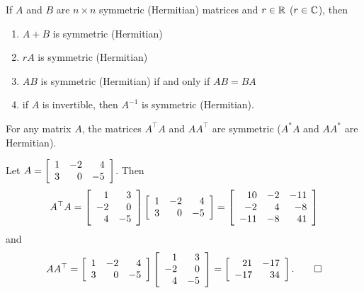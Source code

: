 \begin{Thm} If $A$ and $B$ are $n\times n$ symmetric (Hermitian) matrices and $r\in \R$ ($r\in \C$), then
\begin{multicols}{2}
\begin{enumerate}[!THM!, start =1]
\item $A+B$ is symmetric (Hermitian)\\
\item $rA$ is symmetric (Hermitian)\\
\item $AB$ is symmetric (Hermitian) if and only if $AB=BA$\\
\item if $A$ is invertible, then $A^{-1}$ is symmetric (Hermitian).
\end{enumerate}
\end{multicols}
\end{Thm}%
%

\begin{Thm} For any matrix $A$, the matrices $A^\top A$ and $AA^\top$ are symmetric ($A^*A$ and $AA^*$ are Hermitian).
\end{Thm}

\begin{Exam} Let $A= \mtx{rrr}{1&-2&4\\3&0&-5}$. Then 
\[A^\top A =  \mtx{rr}{1&3\\-2&0\\4&-5}\mtx{rrr}{1&-2&4\\3&0&-5}= \mtx{rrr}{10&-2&-11\\-2&4&-8\\-11&-8&41}\]
and
\[AA^\top = \mtx{rrr}{1&-2&4\\3&0&-5}\mtx{rr}{1&3\\-2&0\\4&-5} = \mtx{rr}{21&-17\\-17&34}. \qedhere\]
\end{Exam}\vs

